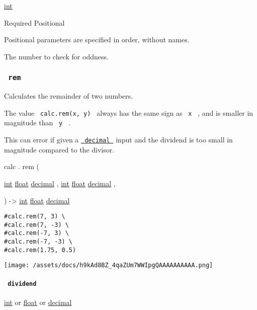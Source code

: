 \href{/docs/reference/foundations/int/}{int}

{Required} {{ Positional }}

\label{functions-odd-value-positional-tooltip}
Positional parameters are specified in order, without names.

The number to check for oddness.

\subsubsection{\texorpdfstring{\texttt{\ rem\ }}{ rem }}\label{functions-rem}

Calculates the remainder of two numbers.

The value \texttt{\ calc.rem(x,\ y)\ } always has the same sign as
\texttt{\ x\ } , and is smaller in magnitude than \texttt{\ y\ } .

This can error if given a
\href{/docs/reference/foundations/decimal/}{\texttt{\ decimal\ }} input
and the dividend is too small in magnitude compared to the divisor.

calc { . } { rem } (

{ \href{/docs/reference/foundations/int/}{int}
\href{/docs/reference/foundations/float/}{float}
\href{/docs/reference/foundations/decimal/}{decimal} , } {
\href{/docs/reference/foundations/int/}{int}
\href{/docs/reference/foundations/float/}{float}
\href{/docs/reference/foundations/decimal/}{decimal} , }

) -\textgreater{} \href{/docs/reference/foundations/int/}{int}
\href{/docs/reference/foundations/float/}{float}
\href{/docs/reference/foundations/decimal/}{decimal}

\begin{verbatim}
#calc.rem(7, 3) \
#calc.rem(7, -3) \
#calc.rem(-7, 3) \
#calc.rem(-7, -3) \
#calc.rem(1.75, 0.5)
\end{verbatim}

\texttt{[image: /assets/docs/h9kAd8BZ\_4qaZUm7WWIpgQAAAAAAAAAA.png]}

\paragraph{\texorpdfstring{\texttt{\ dividend\ }}{ dividend }}\label{functions-rem-dividend}

\href{/docs/reference/foundations/int/}{int} {or}
\href{/docs/reference/foundations/float/}{float} {or}
\href{/docs/reference/foundations/decimal/}{decimal}

